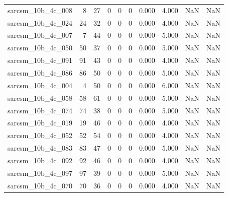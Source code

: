 \documentclass{article}
\begin{document}
\begin{longtable}{lrrrrrrrrr}
sarcsm\_10b\_4c\_008 & 8 & 27 & 0 & 0 & 0 & 0.000 & 4.000 & NaN & NaN \\
sarcsm\_10b\_4c\_024 & 24 & 32 & 0 & 0 & 0 & 0.000 & 4.000 & NaN & NaN \\
sarcsm\_10b\_4c\_007 & 7 & 44 & 0 & 0 & 0 & 0.000 & 5.000 & NaN & NaN \\
sarcsm\_10b\_4c\_050 & 50 & 37 & 0 & 0 & 0 & 0.000 & 5.000 & NaN & NaN \\
sarcsm\_10b\_4c\_091 & 91 & 43 & 0 & 0 & 0 & 0.000 & 4.000 & NaN & NaN \\
sarcsm\_10b\_4c\_086 & 86 & 50 & 0 & 0 & 0 & 0.000 & 5.000 & NaN & NaN \\
sarcsm\_10b\_4c\_004 & 4 & 50 & 0 & 0 & 0 & 0.000 & 6.000 & NaN & NaN \\
sarcsm\_10b\_4c\_058 & 58 & 61 & 0 & 0 & 0 & 0.000 & 5.000 & NaN & NaN \\
sarcsm\_10b\_4c\_074 & 74 & 38 & 0 & 0 & 0 & 0.000 & 5.000 & NaN & NaN \\
sarcsm\_10b\_4c\_019 & 19 & 46 & 0 & 0 & 0 & 0.000 & 4.000 & NaN & NaN \\
sarcsm\_10b\_4c\_052 & 52 & 54 & 0 & 0 & 0 & 0.000 & 4.000 & NaN & NaN \\
sarcsm\_10b\_4c\_083 & 83 & 47 & 0 & 0 & 0 & 0.000 & 5.000 & NaN & NaN \\
sarcsm\_10b\_4c\_092 & 92 & 46 & 0 & 0 & 0 & 0.000 & 4.000 & NaN & NaN \\
sarcsm\_10b\_4c\_097 & 97 & 39 & 0 & 0 & 0 & 0.000 & 5.000 & NaN & NaN \\
sarcsm\_10b\_4c\_070 & 70 & 36 & 0 & 0 & 0 & 0.000 & 4.000 & NaN & NaN \\
\end{longtable}
\end{document}
